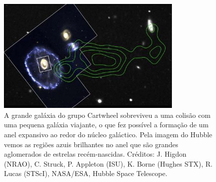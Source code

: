 \begin{figure}[h]
  \centering 
  \includegraphics[width=0.8\textwidth]{Imagens/cartwheel2_hst.jpg} 
  \caption[Galáxia Cartwheel e sua interagente.]{A grande galáxia do grupo Cartwheel sobreviveu a uma colisão com uma pequena galáxia viajante, o que fez possível a formação de um anel expansivo ao redor do núcleo galáctico. Pela imagem do Hubble vemos as regiões azuis brilhantes no anel que são grandes aglomerados de estrelas recém-nascidas. Créditos: J. Higdon (NRAO), C. Struck, P. Appleton (ISU), K. Borne (Hughes STX), R. Lucas (STScI), NASA/ESA, Hubble Space Telescope.}
  \label{fig:g3} 
\end{figure}

